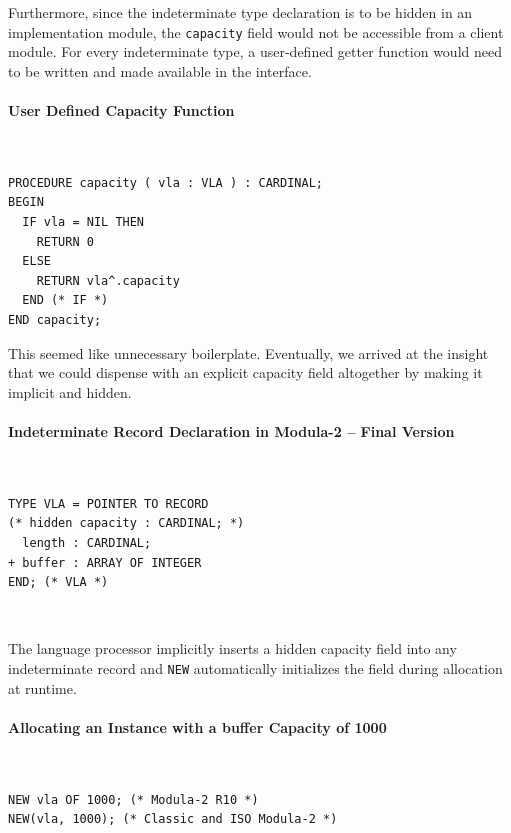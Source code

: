 \documentclass[10pt,a4paper]{article}
\newcommand\sourcecaption[1]{\noindent\normalfont\small\textsf{#1}}
\begin{document}
Furthermore, since the indeterminate type declaration is to be hidden in an
implementation module, the \verb|capacity| field would not be accessible from
a client module. For every indeterminate type, a user-defined getter function
would need to be written and made available in the interface.

\paragraph{\sourcecaption{User Defined Capacity Function}}~

\lstset{style=modula2}
\begin{lstlisting}
PROCEDURE capacity ( vla : VLA ) : CARDINAL;
BEGIN
  IF vla = NIL THEN
    RETURN 0
  ELSE
    RETURN vla^.capacity
  END (* IF *)
END capacity;
\end{lstlisting}

\par\noindent This seemed like unnecessary boilerplate. Eventually, we arrived
at the insight that we could dispense with an explicit capacity field
altogether by making it implicit and hidden.

\paragraph{\sourcecaption{Indeterminate Record Declaration in Modula-2
-- Final Version}}~

\lstset{style=modula2}
\begin{lstlisting}
TYPE VLA = POINTER TO RECORD
(* hidden capacity : CARDINAL; *)
  length : CARDINAL;
+ buffer : ARRAY OF INTEGER
END; (* VLA *)
\end{lstlisting}~

\par\noindent The language processor implicitly inserts a hidden capacity
field into any indeterminate record and \verb|NEW| automatically initializes
the field during allocation at runtime.

\paragraph{\sourcecaption{Allocating an Instance with a buffer Capacity of 1000}}~

\lstset{style=modula2}
\begin{lstlisting}
NEW vla OF 1000; (* Modula-2 R10 *)
NEW(vla, 1000); (* Classic and ISO Modula-2 *)
\end{lstlisting}~
\end{document}
